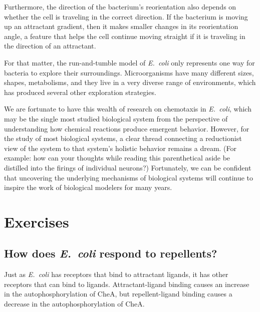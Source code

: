 Furthermore, the direction of the bacterium's reorientation also depends on whether the cell is traveling in the correct direction. If the bacterium is moving up an attractant gradient, then it makes smaller changes in its reorientation angle, a feature that helps the cell continue moving straight if it is traveling in the direction of an attractant.

For that matter, the run-and-tumble model of \textit{E.~coli} only represents one way for bacteria to explore their surroundings. Microorganisms have many different sizes, shapes, metabolisms, and they live in a very diverse range of environments, which has produced several other exploration strategies.

We are fortunate to have this wealth of research on chemotaxis in \textit{E.~coli}, which may be the single most studied biological system from the perspective of understanding how chemical reactions produce emergent behavior. However, for the study of most biological systems, a clear thread connecting a reductionist view of the system to that system's holistic behavior remains a dream. (For example: how can your thoughts while reading this parenthetical aside be distilled into the firings of individual neurons?)  Fortunately, we can be confident that uncovering the underlying mechanisms of biological systems will continue to inspire the work of biological modelers for many years.\\

\newpage

\FloatBarrier
{}
\section{Exercises}

\subsection{How does \textit{E.~coli} respond to repellents?}

Just as \textit{E.~coli} has receptors that bind to attractant ligands, it has other receptors that can bind to  ligands. Attractant-ligand binding causes an increase in the autophosphorylation of CheA, but repellent-ligand binding causes a decrease in the autophosphorylation of CheA.\\

\begin{exercise}\end{exercise}


